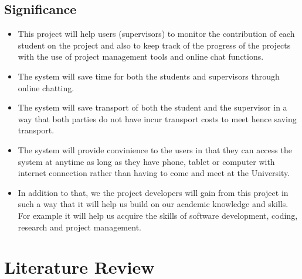 \documentclass{article}
\begin{document}
\subsection{Significance}
\begin{itemize}
\item This project will help users (supervisors) to monitor the contribution of
each student on the project and also to keep track of the progress of
the projects with the use of project management tools and online chat
functions.
\item The  system will save time for both the students and supervisors
through online chatting.
\item The  system will save transport of both the student and the
supervisor in a way that both parties do not have incur transport costs to
meet hence saving transport.
\item The system will provide convinience to the users in that they can access
the system at anytime as long as they have phone, tablet or computer
with internet connection rather than having to come and meet at the
University.
\item In addition to that, we the project developers will gain from this project in
such a way that it will help us build on our academic knowledge and skills.
For example it will help us acquire the skills of software development,
coding, research and project management.
\end{itemize}
\section{Literature Review}
\end{document}
